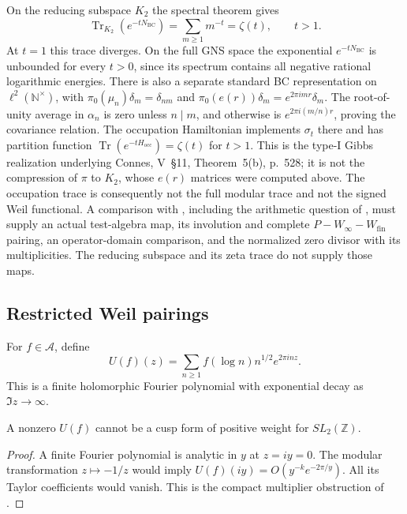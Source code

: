 \begin{remark}
\label{v4-arith:w5-direct:rem:HPAr-stop}
On the reducing subspace $K_2$ the spectral theorem gives
\[
 \operatorname{Tr}_{K_2}(e^{-tN_{\mathrm{BC}}})
       =\sum_{m\ge1}m^{-t}=\zeta(t),\qquad t>1.
\]
At $t=1$ this trace diverges. On the full GNS space the exponential
$e^{-tN_{\mathrm{BC}}}$ is unbounded for every $t>0$, since its
spectrum contains all negative rational logarithmic energies.
There is also a separate standard BC representation on
$\ell^2(\mathbb N^\times)$, with
$\pi_0(\mu_n)\delta_m=\delta_{nm}$ and
$\pi_0(e(r))\delta_m=e^{2\pi i m r}\delta_m$.
The root-of-unity average in $\alpha_n$ is zero unless $n\mid m$,
and otherwise is $e^{2\pi i(m/n)r}$, proving the covariance relation.
The occupation Hamiltonian implements $\sigma_t$ there and has
partition function $\operatorname{Tr}(e^{-tH_{\mathrm{occ}}})=\zeta(t)$
for $t>1$. This is the type-I Gibbs realization underlying
Connes, V~\S11, Theorem~5(b), p.~528; it is not the compression of
$\pi$ to $K_2$, whose $e(r)$ matrices were computed above.
The occupation trace is consequently not the full modular trace
and not the signed Weil functional. A comparison with
, including the arithmetic
question of , must supply
an actual test-algebra map, its involution and complete
$P-W_\infty-W_{\mathrm{fin}}$ pairing, an operator-domain comparison,
and the normalized zero divisor with its multiplicities.
The reducing subspace and its zeta trace do not supply those maps.
\end{remark}

\subsection{Restricted Weil pairings}
\label{v4-arith:w5-direct:step-5}

\begin{definition}
\label{v4-arith:w5-direct:def:mellin-lift}
For $f\in\mathscr A$, define
\begin{equation}
\label{v4-arith:w5-direct:eq:mellin-lift}
 U(f)(z)=\sum_{n\ge1}f(\log n)n^{1/2}e^{2\pi inz}.
\end{equation}
This is a finite holomorphic Fourier polynomial with exponential
decay as $\Im z\to\infty$.
\end{definition}

\begin{proposition}
A nonzero $U(f)$ cannot be a cusp form of positive weight for
$SL_2(\mathbb Z)$.
\end{proposition}
\begin{proof}
A finite Fourier polynomial is analytic in $y$ at $z=iy=0$.
The modular transformation $z\mapsto-1/z$ would imply
$U(f)(iy)=O(y^{-k}e^{-2\pi/y})$. All its Taylor coefficients
would vanish. This is the compact multiplier obstruction of
.
\end{proof}

